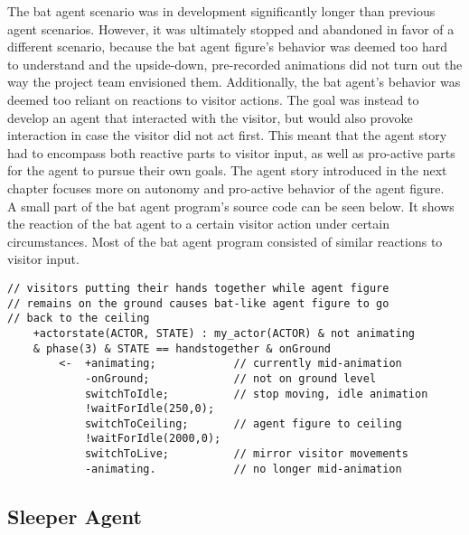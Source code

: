 \documentclass[draft,final]{vutinfth} %
\begin{document}
The bat agent scenario was in development significantly longer than previous agent scenarios. 
However, it was ultimately stopped and abandoned in favor of a different scenario, because the bat agent figure’s behavior was deemed too hard to understand and the upside-down, pre-recorded animations did not turn out the way the project team envisioned them. 
Additionally, the bat agent’s behavior was deemed too reliant on reactions to visitor actions. 
The goal was instead to develop an agent that interacted with the visitor, but would also provoke interaction in case the visitor did not act first. 
This meant that the agent story had to encompass both reactive parts to visitor input, as well as pro-active parts for the agent to pursue their own goals. 
The agent story introduced in the next chapter focuses more on autonomy and pro-active behavior of the agent figure. \\
A small part of the bat agent program’s source code can be seen below. 
It shows the reaction of the bat agent to a certain visitor action under certain circumstances. 
Most of the bat agent program consisted of similar reactions to visitor input.
\begin{verbatim}
// visitors putting their hands together while agent figure 
// remains on the ground causes bat-like agent figure to go 
// back to the ceiling
    +actorstate(ACTOR, STATE) : my_actor(ACTOR) & not animating 
    & phase(3) & STATE == handstogether & onGround
        <-  +animating;	           // currently mid-animation
            -onGround;             // not on ground level
            switchToIdle;          // stop moving, idle animation
            !waitForIdle(250,0);   
            switchToCeiling;       // agent figure to ceiling
            !waitForIdle(2000,0);	
            switchToLive;          // mirror visitor movements
            -animating.            // no longer mid-animation
\end{verbatim}

\subsection{Sleeper Agent}
\label{chap:sleeper}
\end{document}
